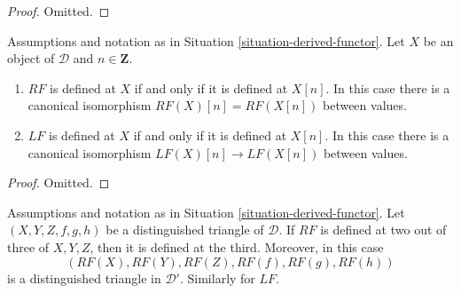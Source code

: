 \begin{proof}
Omitted.
\end{proof}

\begin{lemma}
\label{lemma-derived-shift}
Assumptions and notation as in
Situation \ref{situation-derived-functor}.
Let $X$ be an object of $\mathcal{D}$ and $n \in \mathbf{Z}$.
\begin{enumerate}
\item $RF$ is defined at $X$ if and only if it is defined at $X[n]$.
In this case there is a canonical isomorphism
$RF(X)[n]= RF(X[n])$ between values.
\item $LF$ is defined at $X$ if and only if it is defined at $X[n]$.
In this case there is a canonical isomorphism
$LF(X)[n] \to LF(X[n])$ between values.
\end{enumerate}
\end{lemma}

\begin{proof}
Omitted.
\end{proof}

\begin{lemma}
\label{lemma-2-out-of-3-defined}
Assumptions and notation as in
Situation \ref{situation-derived-functor}.
Let $(X, Y, Z, f, g, h)$ be a distinguished triangle of $\mathcal{D}$.
If $RF$ is defined at two out of three of $X, Y, Z$, then it is defined
at the third. Moreover, in this case
$$
(RF(X), RF(Y), RF(Z), RF(f), RF(g), RF(h))
$$
is a distinguished triangle in $\mathcal{D}'$. Similarly for $LF$.
\end{lemma}

